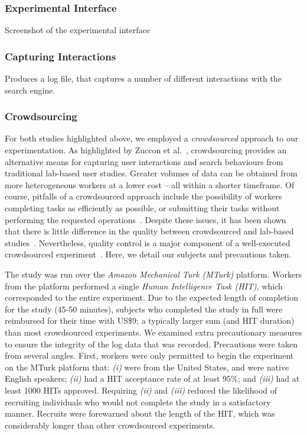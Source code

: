\subsubsection{Experimental Interface}
Screenshot of the experimental interface

\subsubsection{Capturing Interactions}
Produces a log file, that captures a number of different interactions with the search engine.

\subsubsection{Crowdsourcing}
For both studies highlighted above, we employed a \emph{crowdsourced} approach to our experimentation. As highlighted by Zuccon et al.~\cite{zuccon2013crowdsourcing}, crowdsourcing provides an alternative means for capturing user interactions and search behaviours from traditional lab-based user studies. Greater volumes of data can be obtained from more heterogeneous workers at a lower cost -- all within a shorter timeframe. Of course, pitfalls of a crowdsourced approach include the possibility of workers completing tasks as efficiently as possible, or submitting their tasks without performing the requested operations~\cite{feild2010turkers}. Despite these issues, it has been shown that there is little difference in the quality between crowdsourced and lab-based studies~\cite{zuccon2013crowdsourcing}. Nevertheless, quality control is a major component of a well-executed crowdsourced experiment~\cite{bota2016playing_your_cards}. Here, we detail our subjects and precautions taken.

The study was run over the \emph{Amazon Mechanical Turk (MTurk)} platform. Workers from the platform performed a single \emph{Human Intelligence Task (HIT)}, which corresponded to the entire experiment. Due to the expected length of completion for the study (45-50 minutes), subjects who completed the study in full were reimbursed for their time with US\$9; a typically larger sum (and HIT duration) than most crowdsourced experiments. We examined extra precautionary measures to ensure the integrity of the log data that was recorded. Precautions were taken from several angles. First, workers were only permitted to begin the experiment on the MTurk platform that: \emph{(i)} were from the United States, and were native English speakers; \emph{(ii)} had a HIT acceptance rate of at least 95\%; and \emph{(iii)} had at least 1000 HITs approved. Requiring \emph{(ii)} and \emph{(iii)} reduced the likelihood of recruiting individuals who would not complete the study in a satisfactory manner. Recruits were forewarned about the length of the HIT, which was considerably longer than other crowdsourced experiments.

